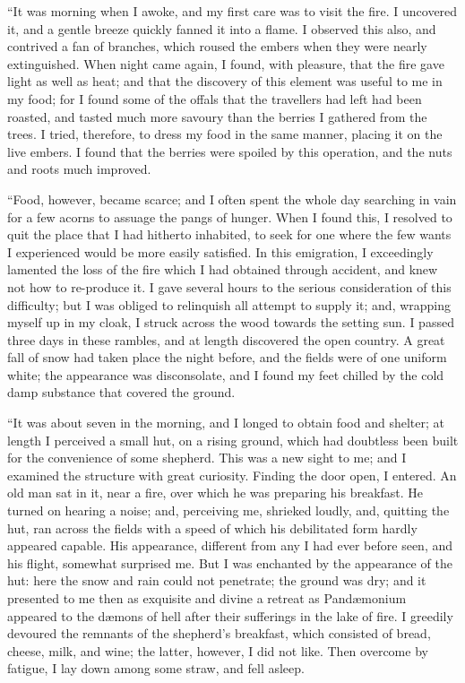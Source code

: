``It was morning when I awoke,
and my first care was to visit the fire.
I uncovered it, and a gentle breeze
quickly fanned it into a flame. I observed
this also, and contrived a fan of
branches, which roused the embers
when they were nearly extinguished.
When night came again, I found, with
pleasure, that the fire gave light as
well as heat; and that the discovery
of this element was useful to me in my
food; for I found some of the offals
that the travellers had left had been
roasted, and tasted much more savoury
than the berries I gathered from the
trees. I tried, therefore, to dress my
food in the same manner, placing it on
the live embers. I found that the berries
were spoiled by this operation, and
the nuts and roots much improved.

``Food, however, became scarce; and
I often spent the whole day searching
in vain for a few acorns to assuage the
pangs of hunger. When I found this,
I resolved to quit the place that I had
hitherto inhabited, to seek for one
where the few wants I experienced
would be more easily satisfied. In this
emigration, I exceedingly lamented the
loss of the fire which I had obtained
through accident, and knew not how to
re-produce it. I gave several hours to
the serious consideration of this
difficulty; but I was obliged to relinquish
all attempt to supply it; and, wrapping
myself up in my cloak, I struck across
the wood towards the setting sun. I
passed three days in these rambles, and
at length discovered the open country.
A great fall of snow had taken place
the night before, and the fields were
of one uniform white; the appearance
was disconsolate, and I found my feet
chilled by the cold damp substance that
covered the ground.

``It was about seven in the morning,
and I longed to obtain food
and shelter; at length I perceived
a small hut, on a rising ground,
which had doubtless been built for
the convenience of some shepherd.
This was a new sight to me; and I
examined the structure with great curiosity.
Finding the door open, I entered.
An old man sat in it, near a
fire, over which he was preparing his
breakfast. He turned on hearing a
noise; and, perceiving me, shrieked
loudly, and, quitting the hut, ran across
the fields with a speed of which
his debilitated form hardly appeared
capable. His appearance, different
from any I had ever before seen, and
his flight, somewhat surprised me. But
I was enchanted by the appearance of
the hut: here the snow and rain could
not penetrate; the ground was dry; and
it presented to me then as exquisite
and divine a retreat as Pandæmonium
appeared to the dæmons of hell after
their sufferings in the lake of fire. I
greedily devoured the remnants of the
shepherd's breakfast, which consisted
of bread, cheese, milk, and wine; the
latter, however, I did not like. Then
overcome by fatigue, I lay down among
some straw, and fell asleep.

